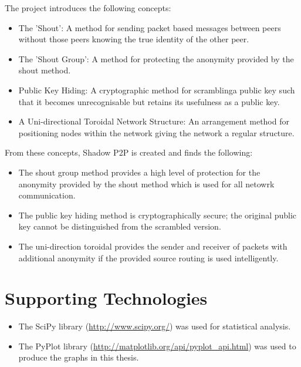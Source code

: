\documentclass[ %
                    author={Luke Murray},
                supervisor={Dr. Simon Hollis},
                     title={Shadow Peer-to-Peer Networks},
                  subtitle={},
                    degree={MEng},
                      year={2013} ]{thesis}
\begin{document}
The project introduces the following concepts:
\begin{itemize}
\item The 'Shout': A method for sending packet based messages between peers without those peers knowing the true identity of the other peer.
\item The 'Shout Group': A method for protecting the anonymity provided by the shout method.
\item Public Key Hiding: A cryptographic method for scramblinga public key such that it becomes unrecognisable but retains its usefulness as a public key.
\item A Uni-directional Toroidal Network Structure: An arrangement method for positioning nodes within the network giving the network a regular structure.
\end{itemize}

From these concepts, Shadow P2P is created and finds the following:
\begin{itemize}
\item The shout group method provides a high level of protection for the anonymity provided by the shout method which is used for all netowrk communication.
\item The public key hiding method is cryptographically secure; the original public key cannot be distinguished from the scrambled version.
\item The uni-direction toroidal provides the sender and receiver of packets with additional anonymity if the provided source routing is used intelligently.
\end{itemize}


\chapter*{Supporting Technologies}

\begin{itemize}
\item The SciPy library (\url{http://www.scipy.org/}) was used for statistical analysis.
\item The PyPlot library (\url{http://matplotlib.org/api/pyplot_api.html}) was used to produce the graphs in this thesis.
\end{itemize}

\end{document}
